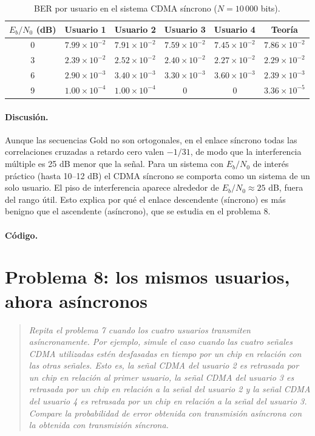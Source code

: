 \documentclass[11pt,a4paper]{article}
\newcommand{\listado}[1]{%
  \VerbatimInput[fontsize=\scriptsize,breaklines=true,breakanywhere=true,
    frame=single,framesep=2pt,rulecolor=\color{gray!50},numbers=left,
    numbersep=4pt]{#1}}
\begin{document}
\begin{table}[H]
  \centering
  \caption{BER por usuario en el sistema CDMA síncrono ($N=10\,000$ bits).}
  \label{tab:p07}
  \begin{tabular}{@{}cccccc@{}}
    \toprule
    $E_b/N_0$ (dB) & Usuario 1 & Usuario 2 & Usuario 3 & Usuario 4 & Teoría \\
    \midrule
    0 & $7.99\times10^{-2}$ & $7.91\times10^{-2}$ & $7.59\times10^{-2}$ & $7.45\times10^{-2}$ & $7.86\times10^{-2}$ \\
    3 & $2.39\times10^{-2}$ & $2.52\times10^{-2}$ & $2.40\times10^{-2}$ & $2.27\times10^{-2}$ & $2.29\times10^{-2}$ \\
    6 & $2.90\times10^{-3}$ & $3.40\times10^{-3}$ & $3.30\times10^{-3}$ & $3.60\times10^{-3}$ & $2.39\times10^{-3}$ \\
    9 & $1.00\times10^{-4}$ & $1.00\times10^{-4}$ & $0$ & $0$ & $3.36\times10^{-5}$ \\
    \bottomrule
  \end{tabular}
\end{table}

\paragraph{Discusión.} Aunque las secuencias Gold no son ortogonales, en el
enlace síncrono todas las correlaciones cruzadas a retardo cero valen $-1/31$,
de modo que la interferencia múltiple es 25 dB menor que la señal. Para un
sistema con $E_b/N_0$ de interés práctico (hasta 10--12 dB) el CDMA síncrono se
comporta como un sistema de un solo usuario. El piso de interferencia aparece
alrededor de $E_b/N_0\approx25$ dB, fuera del rango útil. Esto explica por qué el
enlace descendente (síncrono) es más benigno que el ascendente (asíncrono), que
se estudia en el problema 8.

\paragraph{Código.}
\listado{problema07.m}

\section{Problema 8: los mismos usuarios, ahora asíncronos}

\begin{quote}
\itshape
Repita el problema 7 cuando los cuatro usuarios transmiten asíncronamente. Por
ejemplo, simule el caso cuando las cuatro señales CDMA utilizadas estén
desfasadas en tiempo por un chip en relación con las otras señales. Esto es, la
señal CDMA del usuario 2 es retrasada por un chip en relación al primer usuario,
la señal CDMA del usuario 3 es retrasada por un chip en relación a la señal del
usuario 2 y la señal CDMA del usuario 4 es retrasada por un chip en relación a la
señal del usuario 3. Compare la probabilidad de error obtenida con transmisión
asíncrona con la obtenida con transmisión síncrona.
\end{quote}
\end{document}
